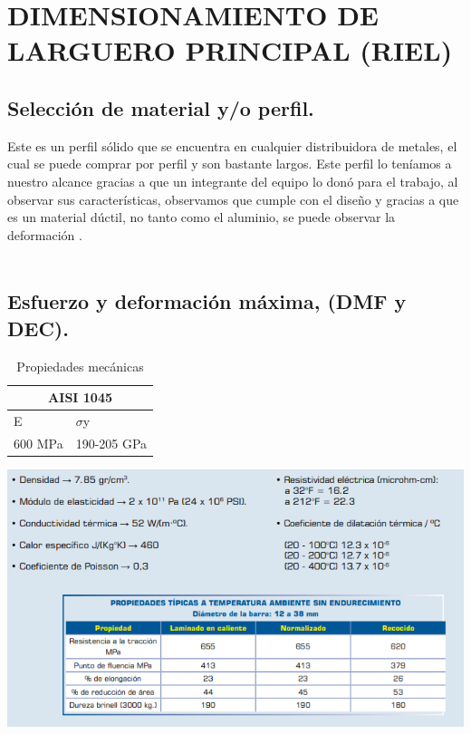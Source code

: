 \chapter{DIMENSIONAMIENTO DE LARGUERO PRINCIPAL (RIEL)}

\section{Selección de material y/o perfil.} %
 \par
Este es un perfil sólido que se encuentra en cualquier distribuidora de metales, el cual se puede comprar por perfil y son bastante largos. Este perfil lo teníamos a nuestro alcance gracias a que un integrante del equipo lo donó para el trabajo, al observar sus características, observamos que cumple con el diseño y gracias a que es un material dúctil, no tanto como el aluminio, se puede observar la deformación .
\\\

\section{Esfuerzo y deformación máxima, (DMF y DEC).}

\begin{table}[htb]
\centering

\begin{tabular}{| p{2.8cm}| p{2.8cm} |}
\hline
\multicolumn{2}{|c|}{AISI 1045} \\
\hline
E &  $\sigma$y \\
\hline \hline
600 MPa & 190-205 GPa  \\ \hline
\end{tabular}
\caption{Propiedades mecánicas}
\label{}
\end{table}

\begin{center}
\includegraphics[width=.6\linewidth]{B/figs/B_1.png} 
\end{center}


